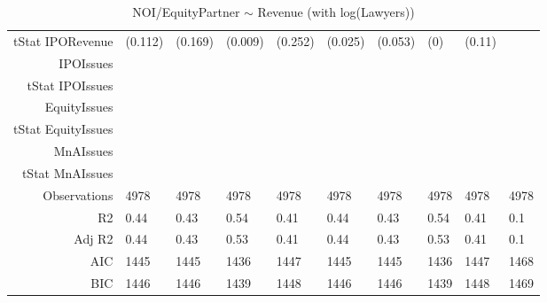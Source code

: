 \begin{table}[ht]
\begin{tabular}{rlllllllll}
  tStat IPORevenue & (0.112) & (0.169) & (0.009) & (0.252) & (0.025) & (0.053) & (0) & (0.11) &  \\ 
  IPOIssues &  &  &  &  &  &  &  &  &  \\ 
  tStat IPOIssues &  &  &  &  &  &  &  &  &  \\ 
  EquityIssues &  &  &  &  &  &  &  &  &  \\ 
  tStat EquityIssues &  &  &  &  &  &  &  &  &  \\ 
  MnAIssues &  &  &  &  &  &  &  &  &  \\ 
  tStat MnAIssues &  &  &  &  &  &  &  &  &  \\ 
  Observations & 4978 & 4978 & 4978 & 4978 & 4978 & 4978 & 4978 & 4978 & 4978 \\ 
  R2 & 0.44 & 0.43 & 0.54 & 0.41 & 0.44 & 0.43 & 0.54 & 0.41 & 0.1 \\ 
  Adj R2 & 0.44 & 0.43 & 0.53 & 0.41 & 0.44 & 0.43 & 0.53 & 0.41 & 0.1 \\ 
  AIC & 1445 & 1445 & 1436 & 1447 & 1445 & 1445 & 1436 & 1447 & 1468 \\ 
  BIC & 1446 & 1446 & 1439 & 1448 & 1446 & 1446 & 1439 & 1448 & 1469 \\ 
   \hline
\end{tabular}
\caption{NOI/EquityPartner $\sim$ Revenue (with log(Lawyers))} 
\end{table}
